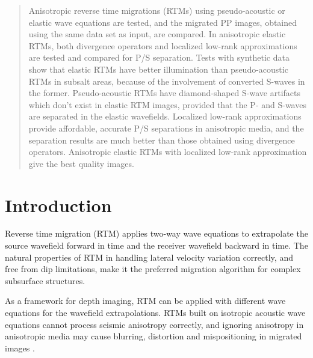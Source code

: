 \documentclass[manuscript,ulem,graphix,revised]{geophysics}
\begin{document}
\begin{abstract}
\indent\indent
Anisotropic reverse time migrations (RTMs) using pseudo-acoustic or elastic wave equations are tested, and the migrated PP images, obtained using the same data set as input, are compared. 
In anisotropic elastic RTMs, both divergence operators and localized low-rank approximations are tested and compared for P/S separation.
Tests with synthetic data show that elastic RTMs have better illumination than pseudo-acoustic RTMs in subsalt areas, because of the involvement of converted S-waves in the former. Pseudo-acoustic RTMs have diamond-shaped S-wave artifacts which don't exist in elastic RTM images, provided that the P- and S-waves are separated in the elastic wavefields. 
Localized low-rank approximations provide affordable, accurate P/S separations in anisotropic media, and the separation results are much better than those obtained using divergence operators.
Anisotropic elastic RTMs with localized low-rank approximation give the best quality images.

\end{abstract}

\section{Introduction}
\indent\indent
Reverse time migration (RTM) \citep{mcmechan83, whitmore83,baysal83} applies two-way wave equations to extrapolate the source wavefield forward in time and the receiver wavefield backward in time. The natural properties of RTM in handling lateral velocity variation correctly, and free from dip limitations, make it the \marginnote{[1]} preferred migration algorithm for complex subsurface structures.

As a framework for depth imaging, RTM can be applied with different wave equations for the wavefield extrapolations. RTMs built on isotropic\marginnote{[2]} acoustic wave equations cannot process seismic anisotropy correctly, and ignoring anisotropy in anisotropic media may cause blurring, distortion and mispositioning in migrated images \citep{huang09}. 
\end{document}
